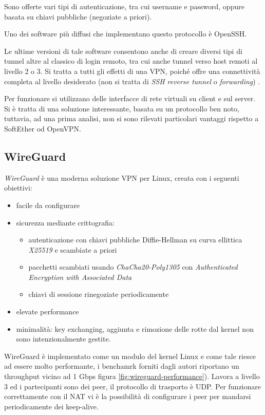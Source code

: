 Sono offerte vari tipi di autenticazione, tra cui username e password, oppure basata
su chiavi pubbliche (negoziate a priori).

Uno dei software più diffusi che implementano questo protocollo è OpenSSH.

Le ultime versioni di tale software consentono anche di creare
diversi tipi di tunnel altre al classico di login remoto, tra cui anche tunnel verso
host remoti al livello 2 o 3. Si tratta a tutti gli effetti di una VPN, poiché
offre una connettività completa al livello desiderato (non si tratta di
\textit{SSH reverse tunnel} o \textit{forwarding})
\cite{ssh-vpn-ubuntu} \cite{ssh-vpn-debian}.

Per funzionare si utilizzano delle interfacce di rete virtuali
su client e sul server. Si è tratta di una soluzione interessante, basata su un
protocollo ben noto, tuttavia, ad una prima analisi, non si sono rilevati
particolari vantaggi rispetto a SoftEther od OpenVPN.

\subsection{WireGuard}
\textit{WireGuard}\cite{DBLP:conf/ndss/Donenfield17} è una moderna soluzione VPN per Linux, creata con i seguenti obiettivi:
\begin{itemize}
	\item facile da configurare
	\item sicurezza mediante crittografia:
	      \begin{itemize}
	      	\item autenticazione con chiavi pubbliche Diffie-Hellman su curva ellittica \textit{X25519}
	      	      e scambiate a priori
	      	\item pacchetti scambiati usando \textit{ChaCha20-Poly1305} con \textit{Authenticated
	      		Encryption with Associated Data}
	      		\item chiavi di sessione rinegoziate periodicamente
	      	\end{itemize}
	      	\item elevate performance
	      	\item minimalità: key exchanging, aggiunta e rimozione delle rotte dal kernel
	      	      non sono intenzionalmente gestite.
	      \end{itemize}
	      WireGuard è implementato come un modulo del kernel Linux e come tale riesce ad essere
	      molto performante, i benchamrk forniti dagli autori riportano un throughput vicino
	      ad 1 Gbps figura \ref{fig:wireguard-performance}).
	      Lavora a livello 3 ed i partecipanti sono dei peer,
	      il protocollo di trasporto è UDP. Per funzionare correttamente con il NAT vi è
	      la possibilità di configurare i peer per mandarsi periodicamente dei keep-alive.
	      
